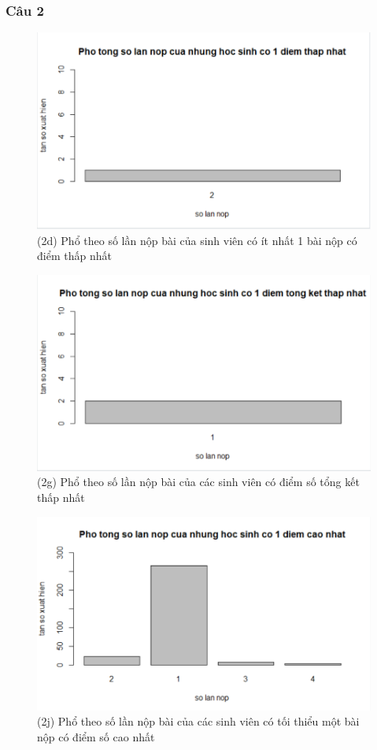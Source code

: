 \documentclass[a4paper]{article}
\theoremstyle{definition}
\begin{document}
\subsubsection{Câu 2}
\begin{figure}[!ht]
    \centering
    \includegraphics[scale=0.4]{Pics/q2d-file4.PNG}
    \caption{(2d) Phổ theo số lần nộp bài của sinh viên có ít nhất 1 bài nộp có điểm thấp nhất}
    \label{fig:my_label}
\end{figure}
\begin{figure}[!ht]
    \centering
    \includegraphics[scale=0.4]{Pics/q2g-file4.PNG}
    \caption{(2g) Phổ theo số lần nộp bài của các sinh viên có điểm số tổng kết thấp nhất }
    \label{fig:my_label}
\end{figure}
\newpage
\begin{figure}[!ht]
    \centering
    \includegraphics[scale=0.4]{Pics/q2j-file4.PNG}
    \caption{(2j)  Phổ theo số lần nộp bài của các sinh viên có tối thiểu một bài nộp có điểm số cao nhất}
    \label{fig:my_label}
\end{figure}
\end{document}
